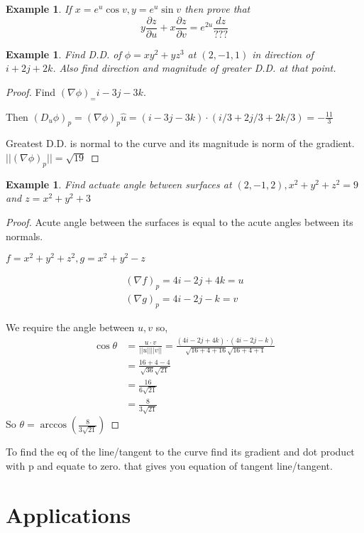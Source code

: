 \documentclass[oneside,11pt,pdftex]{book}%
\numberwithin{equation}{section}
\newtheorem{example}[theorem]{Example}
\numberwithin{section}{chapter}
\numberwithin{equation}{chapter}
\begin{document}
\begin{example}
	If $ x=e^u \cos v, y=e^u \sin v $ then prove that \[ y \frac{\partial z}{\partial u} + x \frac{\partial z}{\partial v}= e^{2u}\frac{dz}{???}\]
\end{example}
\begin{example}
	Find D.D. of $ \phi = xy^2+yz^3 $ at $ (2,-1,1) $ in direction of $ i+2j+2k $. Also find direction and magnitude of greater D.D. at that point.
\end{example}
\begin{proof}
	Find $ (\nabla \phi)_ =i-3j-3k$.
	
	Then $ (D_u \phi)_p=(\nabla \phi)_p \hat{u} = (i-3j-3k)\cdot (i/3+2j/3+2k/3)=-\frac{11}{3}$
	
	Greatest D.D. is normal to the curve and its magnitude is norm of the gradient.
	$ ||(\nabla \phi)_p||=\sqrt{19} $
\end{proof}
\begin{example}
	Find actuate angle between surfaces at $ (2,-1,2), x^2+y^2+z^2=9 $ and $ z=x^2+y^2+3 $
\end{example}
\begin{proof}
	Acute angle between the surfaces is equal to the acute angles between its normals.
	
	$ f=x^2+y^2+z^2, g=x^2+y^2-z $
	
	\begin{align*}
		(\nabla f)_p=4i-2j+4k=u\\
		(\nabla g)_p=4i-2j-k=v
	\end{align*}

	We require the angle between $ u,v $ so,
	\begin{align*}
		\cos \theta &= \frac{u \cdot v}{||u|| ||v||}=\frac{(4i-2j+4k)\cdot(4i-2j-k)}{\sqrt{16+4+16}\sqrt{16+4+1}}\\
		&=\frac{16+4-4}{\sqrt{36}\sqrt{21}}\\
		&=\frac{16}{6 \sqrt{21}}\\
		&= \frac{8}{3 \sqrt{21}}
	\end{align*}
So $ \theta = \arccos \left(\frac{8}{3 \sqrt{21}}\right) $
\end{proof}

To find the eq of the line/tangent to the curve find its gradient and dot product with p and equate to zero. that gives you equation of tangent line/tangent.

\chapter{Applications}
\backmatter
\end{document}
